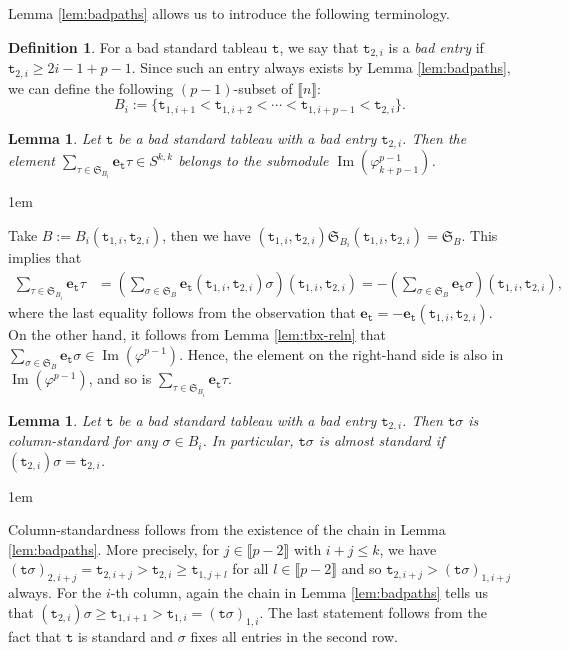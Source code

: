 \documentclass[a4paper]{amsart}
\makeatletter
\numberwithin{equation}{subsection}
\newtheorem{lemma}[theorem]{Lemma}
\theoremstyle{definition}
\newtheorem{definition}[theorem]{Definition}
\newcommand{\interval}[1]{\llbracket #1 \rrbracket}
\DeclareMathOperator{\Image}{\mathrm{Im}}
\newcommand{\bfe}{\pmb{e}}
\newcommand{\tbx}{\mathtt{t}}
\renewenvironment{proof}[1][\proofname]{\par
	\pushQED{\qed}%
	\normalfont \topsep0\p@\@plus6\p@ \labelsep1em\relax
	\trivlist
	\item[\hskip\labelsep\bfseries #1]\ignorespaces
	\mbox{}%
}{
	\popQED\endtrivlist\@endpefalse
}
\numberwithin{equation}{subsection}
\makeatother
\begin{document}
Lemma \ref{lem:badpaths} allows us to introduce the following terminology.
\begin{definition}\label{def:Bi}
For a bad standard tableau $\tbx$, we say that $\tbx_{2,i}$ is a \emph{bad entry} if $\tbx_{2,i}\geq 2i-1+p-1$.
Since such an entry always exists by Lemma \ref{lem:badpaths}, we can  define the following $(p-1)$-subset of $\interval{n}$:
\[
B_i:=\{\tbx_{1,i+1} < \tbx_{1,i+2} < \cdots < \tbx_{1,i+p-1} < \tbx_{2,i}\}.
\]
\end{definition}

\begin{lemma}\label{lem:tbx-out}
Let $\tbx$ be a bad standard tableau with a bad entry $\tbx_{2,i}$.
Then the element $\sum_{\tau\in \mathfrak{S}_{B_i}} \bfe_{\tbx}\tau \in S^{k,k}$ belongs to the submodule $\Image(\varphi_{k+p-1}^{p-1})$.
\end{lemma}
\begin{proof}
Take $B:=B_i(\tbx_{1,i},\tbx_{2,i})$, then we have $(\tbx_{1,i},\tbx_{2,i})\mathfrak{S}_{B_i}(\tbx_{1,i},\tbx_{2,i}) = \mathfrak{S}_B$.
This implies that
\begin{align*}
\sum_{\tau\in\mathfrak{S}_{B_i}}\bfe_{\tbx}\tau  &=  \left(\sum_{\sigma \in \mathfrak{S}_B} \bfe_{\tbx}(\tbx_{1,i},\tbx_{2,i})\sigma\right) (\tbx_{1,i},\tbx_{2,i}) = -\left(\sum_{\sigma \in \mathfrak{S}_B} \bfe_{\tbx}\sigma\right) (\tbx_{1,i},\tbx_{2,i}),
\end{align*}
where the last equality follows from the observation that $\bfe_\tbx = -\bfe_\tbx(\tbx_{1,i},\tbx_{2,i})$.
On the other hand, it follows from Lemma \ref{lem:tbx-reln} that $\sum_{\sigma\in\mathfrak{S}_B}\bfe_{\tbx}\sigma \in \Image(\varphi^{p-1})$.
Hence, the element on the right-hand side is also in $\Image(\varphi^{p-1})$, and so is $\sum_{\tau\in \mathfrak{S}_{B_i}} \bfe_\tbx \tau$.
\end{proof}


\begin{lemma}\label{lem:badpaths2}
Let $\tbx$ be a bad standard tableau with a bad entry $\tbx_{2,i}$.
Then $\tbx\sigma$ is column-standard for any $\sigma\in B_i$.
In particular, $\tbx\sigma$ is almost standard if $(\tbx_{2,i})\sigma=\tbx_{2,i}$.
\end{lemma}
\begin{proof} 
Column-standardness follows from the existence of the chain in Lemma \ref{lem:badpaths}.
More precisely, for $j \in \interval{p-2}$ with $i+j\leq k$, we have $(\tbx\sigma)_{2,i+j}=\tbx_{2,i+j}>\tbx_{2,i}\geq \tbx_{1,j+l}$ for all $l\in\interval{p-2}$ and so $\tbx_{2,i+j}>(\tbx\sigma)_{1,i+j}$ always.
For the $i$-th column, again the chain in Lemma \ref{lem:badpaths} tells us that $(\tbx_{2,i})\sigma\geq\tbx_{1,i+1}>\tbx_{1,i}=(\tbx\sigma)_{1,i}$.
The last statement follows from the fact that $\tbx$ is standard and $\sigma$ fixes all entries in the second row.
\end{proof}
\end{document}
